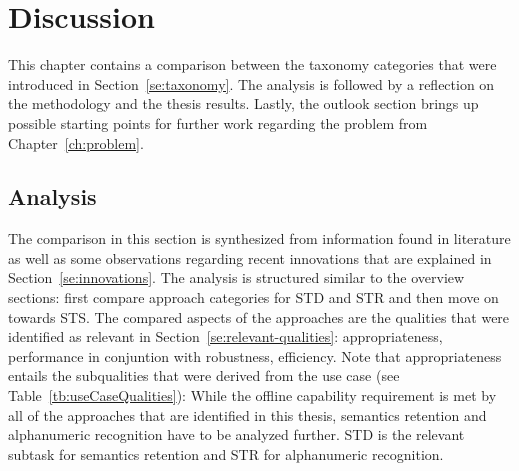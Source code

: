\chapter{Discussion}\label{ch:discussion}
This chapter contains a comparison between the taxonomy categories that were introduced in
Section~\ref{se:taxonomy}.
The analysis is followed by a reflection on the methodology and the thesis results.
Lastly, the outlook section brings up possible starting points for further work regarding the
problem from Chapter~\ref{ch:problem}.

\section{Analysis}\label{se:analysis}
The comparison in this section is synthesized from information found in literature as well as
some observations regarding recent innovations that are explained in Section~\ref{se:innovations}.
The analysis is structured similar to the overview sections: first compare approach categories
for \ac{STD} and \ac{STR} and then move on towards \ac{STS}.
The compared aspects of the approaches are the qualities that were identified as relevant in
Section~\ref{se:relevant-qualities}: appropriateness, performance in conjuntion with robustness,
efficiency.
Note that appropriateness entails the subqualities that were derived from the use
case (see Table~\ref{tb:useCaseQualities}):
While the offline capability requirement is met by all of the approaches that are identified in this
thesis, semantics retention and alphanumeric recognition have to be analyzed further.
\ac{STD} is the relevant subtask for semantics retention and \ac{STR} for alphanumeric recognition.

